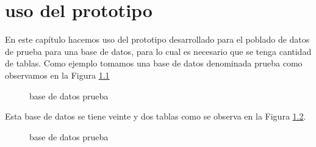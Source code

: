\chapter{uso del prototipo}
En este cap\'itulo hacemos uso del prototipo desarrollado para el poblado de datos de prueba para una base de datos, para lo cual es necesario que se tenga cantidad de tablas.
Como ejemplo tomamos  una base de datos denominada prueba como observamos en la Figura \ref{fig:createDatabase}

\begin{figure}[H]
\caption{base de datos prueba} \label{fig:createDatabase}
\centering
{}
\end{figure}

Esta base de datos se tiene veinte y dos tablas como se observa en la Figura \ref{fig:listatablePrueba}. 
\begin{figure}[H]
\caption{base de datos prueba} \label{fig:listatablePrueba}
\centering
{}
\end{figure}

